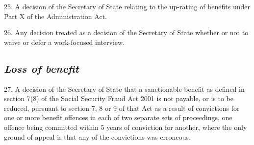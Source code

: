 \documentclass[12pt,a4paper]{article}
\begin{document}
25.  A decision of the Secretary of State relating to the up-rating of benefits under Part X of the Administration Act.

26.  Any decision treated as a decision of the Secretary of State whether or not to waive or defer a work-focused interview.


\subsection*{\itshape Loss of benefit}

27.  A decision of the Secretary of State that a sanctionable benefit as defined in section 7(8) of the Social Security Fraud Act 2001 is not payable, or is to be reduced, pursuant to section 7, 8 or 9 of that Act as a result of convictions for one or more benefit offences in each of two separate sets of proceedings, one offence being committed within 
5 years  %
of conviction for another, where the only ground of appeal is that any of the convictions was erroneous.

\end{document}
